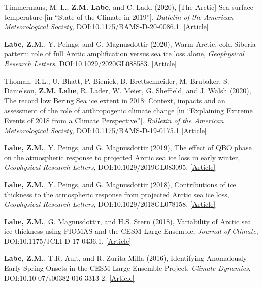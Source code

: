 \documentclass[margin,line,palatino,courier,10pt]{res}
\begin{document}
\begin{resume}
\begin{etaremune}[leftmargin=0in,topsep=0in,parsep=0in]
\item Timmermans, M.-L., \textbf{Z.M. Labe}, and C. Ladd (2020), [The Arctic] Sea surface temperature [in ``State of the Climate in 2019'']. \textit{Bulletin of the American Meteorological Society}, DOI:10.1175/BAMS-D-20-0086.1. \href{https://doi.org/10.1175/BAMS-D-20-0086.1}{[Article]}
\item \textbf{Labe, Z.M.}, Y. Peings, and G. Magnusdottir (2020), Warm Arctic, cold Siberia pattern: role of full Arctic amplification versus sea ice loss alone, \textit{Geophysical Research Letters}, DOI:10.1029/2020GL088583. \href{https://agupubs.onlinelibrary.wiley.com/doi/10.1029/2020GL088583}{[Article]}
\item Thoman, R.L., U. Bhatt, P. Bieniek, B. Brettschneider, M. Brubaker, S. Danielson, \textbf{Z.M. Labe}, R. Lader, W. Meier, G. Sheffield, and J. Walsh (2020), The record low Bering Sea ice extent in 2018: Context, impacts and an assessment of the role of anthropogenic climate change [in ``Explaining Extreme Events of 2018 from a Climate Perspective'']. \textit{Bulletin of the American Meteorological Society}, DOI:10.1175/BAMS-D-19-0175.1 \href{https://journals.ametsoc.org/doi/abs/10.1175/BAMS-D-19-0175.1}{[Article]}
\item \textbf{Labe, Z.M.}, Y. Peings, and G. Magnusdottir (2019), The effect of QBO phase on the atmospheric response to projected Arctic sea ice loss in early winter, \textit{Geophysical Research Letters}, DOI:10.1029/2019GL083095. \href{https://agupubs.onlinelibrary.wiley.com/doi/10.1029/2019GL083095}{[Article]}
\item \textbf{Labe, Z.M.}, Y. Peings, and G. Magnusdottir (2018), Contributions of ice thickness to the atmospheric response from projected Arctic sea ice loss, \textit{Geophysical Research Letters}, DOI:10.1029/2018GL078158. \href{https://agupubs.onlinelibrary.wiley.com/doi/10.1029/2018GL078158}{[Article]}
\item \textbf{Labe, Z.M.}, G. Magnusdottir, and H.S. Stern (2018), Variability of Arctic sea ice thickness using PIOMAS and the CESM Large Ensemble, \textit{Journal of Climate}, DOI:10.1175/JCLI-D-17-0436.1. \href{https://journals.ametsoc.org/doi/abs/10.1175/JCLI-D-17-0436.1}{[Article]}
\item \textbf{Labe, Z.M.}, T.R. Ault, and R. Zurita-Milla (2016), Identifying Anomalously Early Spring Onsets in the CESM Large Ensemble Project, \textit{Climate Dynamics}, DOI:10.10 07/s00382-016-3313-2. \href{http://link.springer.com/article/10.1007/s00382-016-3313-2}{[Article]}
\end{etaremune}


\end{resume}
\end{document}
